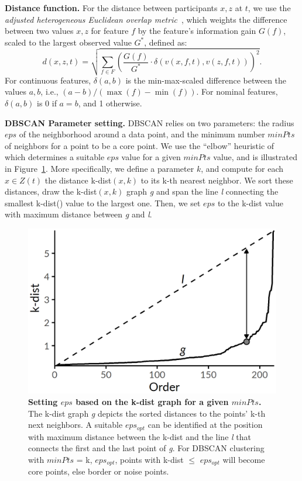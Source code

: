 \documentclass[
  oneside]{book}
\begin{document}
\textbf{Distance function.}
For the distance between participants \(x,z\) at \(t\), we use the \emph{adjusted heterogeneous Euclidean overlap metric}~\autocite{HielscherEtAl:IDA14,Wilson97}, which weights the difference between two values \(x,z\) for feature \(f\) by the feature's information gain \(G(f)\), scaled to the largest observed value \(G^*\), defined as:
\begin{equation}
d(x,z,t)=\sqrt{\sum_{f \in F} \left(\frac{G(f)}{G^*}\cdot \delta\left(v(x,f,t),v(z,f,t)\right)\right)^2}.
\label{eq:heom-adjusted}
\end{equation}
For continuous features, \(\delta(a,b)\) is the min-max-scaled difference between the values \(a,b\), i.e., \((a-b)/(\max(f)-\min(f))\).
For nominal features, \(\delta(a,b)\) is 0 if \(a=b\), and 1 otherwise.

\textbf{DBSCAN Parameter setting.}
DBSCAN relies on two parameters: the radius \(eps\) of the neighborhood around a data point, and the minimum number \(minPts\) of neighbors for a point to be a core point.
We use the ``elbow'' heuristic of ~\autocite{EsterEtAl:DBSCAN96} which determines a suitable \(eps\) value for a given \(minPts\) value, and is illustrated in Figure~\ref{fig:07-k-dist-graph}.
More specifically, we define a parameter \(k\), and compute for each \(x\in{}Z(t)\) the distance k-dist\((x,k)\) to its k-th nearest neighbor.
We sort these distances, draw the k-dist\((x,k)\) graph \emph{g} and span the line \emph{l} connecting the smallest k-dist() value to the largest one.
Then, we set \(eps\) to the k-dist value with maximum distance between \emph{g} and \emph{l}.



\begin{figure}

{\centering \includegraphics[width=0.34\linewidth]{figures/07-k-dist-graph} 

}

\caption{\textbf{Setting \(eps\) based on the k-dist graph for a given \(minPts\).} The k-dist graph \emph{g} depicts the sorted distances to the points' k-th next neighbors. A suitable \(eps_{opt}\) can be identified at the position with maximum distance between the k-dist and the line \emph{l} that connects the first and the last point of \emph{g}. For DBSCAN clustering with \(minPts\) = k, \(eps_{opt}\), points with k-dist \(\leq\) \(eps_{opt}\) will become core points, else border or noise points.}\label{fig:07-k-dist-graph}
\end{figure}
\end{document}
